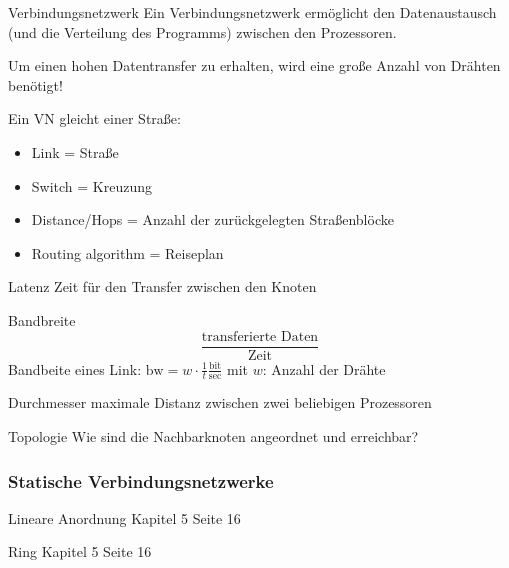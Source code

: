 \begin{defi}{Verbindungsnetzwerk}
     Ein Verbindungsnetzwerk ermöglicht den Datenaustausch (und die Verteilung des Programms) zwischen den Prozessoren.

     Um einen hohen Datentransfer zu erhalten, 
     wird eine große Anzahl von Drähten benötigt!

     Ein VN gleicht einer Straße:
     \begin{itemize}
        \item Link = Straße
        \item Switch = Kreuzung 
        \item Distance/Hops = Anzahl der zurückgelegten Straßenblöcke
        \item Routing algorithm = Reiseplan
     \end{itemize}

\end{defi}

\begin{defi}[Verbindungsnetzwerk]{Latenz}
    Zeit für den Transfer zwischen den Knoten
\end{defi}

\begin{defi}[Verbindungsnetzwerk]{Bandbreite}
    \[\frac{\text{transferierte Daten}}{\text{Zeit}}\]
    Bandbeite eines Link: $\text{bw} = w \cdot \frac{1}{t}\frac{\text{bit}}{\text{sec}}$
    mit $w$: Anzahl der Drähte
\end{defi}

\begin{defi}[Verbindungsnetzwerk]{Durchmesser}
    maximale Distanz zwischen zwei beliebigen Prozessoren
\end{defi}

\begin{defi}[Verbindungsnetzwerk]{Topologie}
    Wie sind die Nachbarknoten angeordnet und erreichbar?
\end{defi}

\subsubsection{Statische Verbindungsnetzwerke}

\begin{defi}{Lineare Anordnung}
    Kapitel 5 Seite 16
\end{defi}

\begin{defi}{Ring}
    Kapitel 5 Seite 16
\end{defi}

